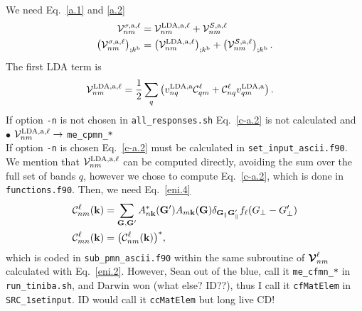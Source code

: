 We need Eq.~\eqref{a.1} and \eqref{a.2}
\begin{align}\label{c-a.1}
{\mathbf{\cal V}}^{\sigma,\mathrm{a},\ell}_{nm}
&=
{\mathbf{\cal V}}^{\mathrm{LDA},\mathrm{a},\ell}_{nm}
+
{\mathbf{\cal V}}^{{\cal S},\mathrm{a},\ell}_{nm}
\nonumber\\
\left(
{\mathbf{\cal V}}^{\sigma,\mathrm{a},\ell}_{nm}
\right)_{;k^{\mathrm{b}}}
&=
\left(
{\mathbf{\cal V}}^{\mathrm{LDA},\mathrm{a},\ell}_{nm}
\right)_{;k^{\mathrm{b}}}
+
\left(
{\mathbf{\cal V}}^{{\cal S},\mathrm{a},\ell}_{nm}
\right)_{;k^{\mathrm{b}}}
.
\end{align}
 The first LDA term is
\begin{align}\label{c-a.2}
{\mathbf{\cal V}}^{\mathrm{LDA},\mathrm{a},\ell}_{nm}
&=
\frac{1}{2}\sum_q\left(
v^{\mathrm{LDA},\mathrm{a}}_{nq}{\mathbf{\cal C}}^\ell_{qm}+{\mathbf{\cal C}}^\ell_{nq} v^{\mathrm{LDA},\mathrm{a}}_{qm}
\right)
.
\end{align} 
If option \verb=-n= is not chosen in \verb=all_responses.sh=
Eq.~\eqref{c-a.2}
 is
not calculated and\\
$\bullet$ ${\mathbf{\cal V}}^{\mathrm{LDA},\mathrm{a},\ell}_{nm}\to$ \verb=me_cpmn_*=\\  
If option \verb=-n= is chosen Eq.~\eqref{c-a.2}
 must be calculated in
\verb=set_input_ascii.f90=. We mention that
${\mathbf{\cal V}}^{\mathrm{LDA},\mathrm{a},\ell}_{nm}$ can be computed directly,\cite{nicolaspc}
avoiding the sum over the full set of bands $q$, however we chose to
compute Eq.~\eqref{c-a.2}, which is done in
\verb=functions.f90=.
Then, we need 
Eq.~\eqref{eni.4}
\begin{align}\label{c-eni.4}
{\mathbf{\cal C}}^\ell_{nm}(\mathbf{k})&=
\sum_{\mathbf{G},\mathbf{G}'} A^*_{n\mathbf{k}}(\mathbf{G}')  A_{m\mathbf{k}}(\mathbf{G})
\delta_{\mathbf{G}_\parallel \mathbf{G}'_\parallel}
f_\ell(G_\perp-G'_\perp)
\nonumber\\
{\mathbf{\cal C}}^\ell_{mn}(\mathbf{k})&=
\big({\mathbf{\cal C}}^\ell_{nm}(\mathbf{k})\big)^*
,
\end{align} 
which is coded in \verb=sub_pmn_ascii.f90= within the same subroutine of $\boldsymbol{\mathcal{\cal V}}^\ell_{nm}$
calculated with Eq.~\eqref{eni.2}. However, Sean out of the blue, call
it \verb=me_cfmn_*= in \verb=run_tiniba.sh=,
 and Darwin won (what else? ID??), 
thus I call it \verb=cfMatElem= in \verb=SRC_1setinput=. ID would call
it  \verb=ccMatElem=
but long live CD!


